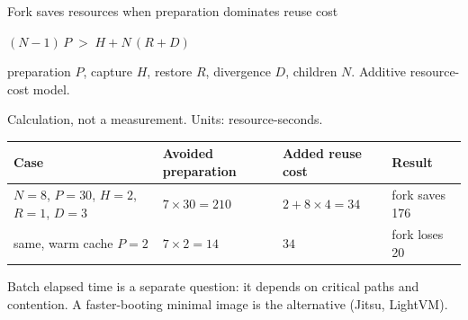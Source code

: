 \begin{frame}[t]{\ev{\tagO}Fork saves resources when preparation dominates reuse cost}
\vspace{.1cm}
\begin{center}
{\Large$(N-1)\,P \;>\; H + N\,(R+D)$\par}
\vspace{.15cm}
{\small preparation $P$, capture $H$, restore $R$, divergence $D$, children $N$. Additive resource-cost model.\par}
\end{center}
\vspace{.1cm}
{\small\color{Muted}Calculation, not a measurement. Units: resource-seconds.\par}
\vspace{.05cm}
{\small
\begin{tabularx}{\textwidth}{@{}L{4.6cm}L{3.0cm}L{2.9cm}Y@{}}
\toprule
Case & Avoided preparation & Added reuse cost & Result\\
\midrule
$N{=}8$, $P{=}30$, $H{=}2$, $R{=}1$, $D{=}3$ & $7\times30 = 210$ & $2 + 8\times4 = 34$ & fork saves 176\\
same, warm cache $P{=}2$ & $7\times2 = 14$ & $34$ & fork loses 20\\
\bottomrule
\end{tabularx}\par}
\vspace{.15cm}
{\small Batch elapsed time is a separate question: it depends on critical paths and contention. A faster-booting minimal image is the alternative (Jitsu, LightVM).\par}
\end{frame}
